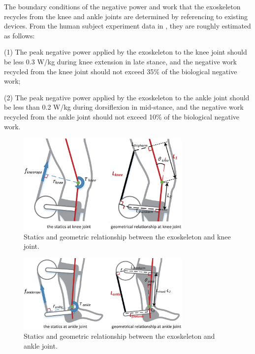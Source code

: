 \documentclass[twocolumn,cleanfoot,10pt]{asme2ej}
\begin{document}
The boundary conditions of the negative power and work that the exoskeleton recycles from the knee and ankle joints are determined by referencing to existing devices.
From the human subject experiment data in \cite{RN5,RN18}, they are roughly estimated as follows:

(1) The peak negative power applied by the exoskeleton to the knee joint should be less 0.3 W/kg during knee extension in late stance, and the negative work recycled from the knee joint should not exceed 35\% of the biological negative work;

(2) The peak negative power applied by the exoskeleton to the ankle joint should be less than 0.2 W/kg during dorsiflexion in mid-stance, and the negative work recycled from the ankle joint should not exceed 10\% of the biological negative work.

\begin{figure}[t]
	\centering
	\includegraphics[width=8.5cm]{kneeparameters.eps}
	\caption{Statics and geometric relationship between the exoskeleton and knee joint.}
	\label{fig:kneeparameters}
\end{figure}

\begin{figure}[t]
	\centering
	\includegraphics[width=8.5cm]{ankleparameters.eps}
	\caption{Statics and geometric relationship between the exoskeleton and ankle joint.}
	\label{fig:ankleparameters}
\end{figure}
\end{document}
